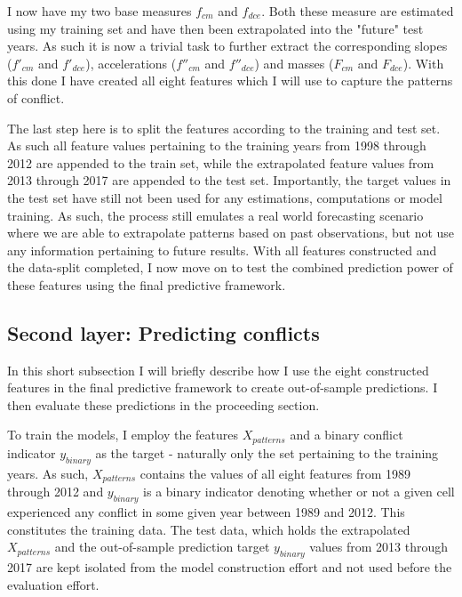 \documentclass[a4paper]{article}
\begin{document}
I now have my two base measures $f_{cm}$ and $f_{dce}$. Both these measure are estimated using my training set and have then been extrapolated into the "future" test years. As such it is now a trivial task to further extract the corresponding slopes ($f'_{cm}$ and $f'_{dce}$), accelerations ($f''_{cm}$ and $f''_{dce}$) and masses ($F_{cm}$ and $F_{dce}$). With this done I have created all eight features which I will use to capture the patterns of conflict.\par

The last step here is to split the features according to the training and test set. As such all feature values pertaining to the training years from 1998 through 2012 are appended to the train set, while the extrapolated feature values from 2013 through 2017 are appended to the test set. Importantly, the target values in the test set have still not been used for any estimations, computations or model training. As such, the process still emulates a real world forecasting scenario where we are able to extrapolate patterns based on past observations, but not use any information pertaining to future results. With all features constructed and the data-split completed, I now move on to test the combined prediction power of these features using the final predictive framework.\par

\subsection{Second layer: Predicting conflicts}

In this short subsection I will briefly describe how I use the eight constructed features in the final predictive framework to create out-of-sample predictions. I then evaluate these predictions in the proceeding section.\par

To train the models, I employ the features $X_{patterns}$ and a binary conflict indicator $y_{binary}$ as the target - naturally only the set pertaining to the training years. As such, $X_{patterns}$ contains the values of all eight features from 1989 through 2012 and $y_{binary}$ is a binary indicator denoting whether or not a given cell experienced any conflict in some given year between 1989 and 2012. This constitutes the training data. The test data, which holds the extrapolated $X_{patterns}$ and the out-of-sample prediction target $y_{binary}$ values from 2013 through 2017 are kept isolated from the model construction effort and not used before the evaluation effort.\par
\end{document}
